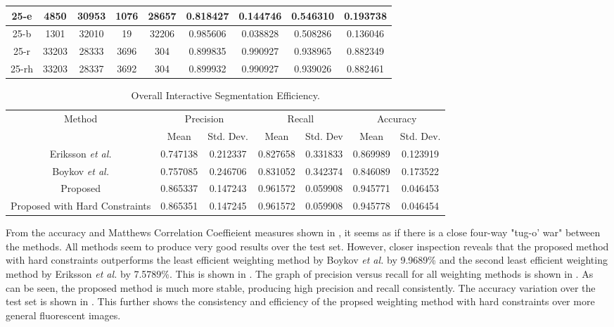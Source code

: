 \begin{longtable}[!h]{|c|c|c|c|c|c|c|c|c|}
	\hline	25-e	&	4850	&	30953	&	1076	&	28657	&	0.818427	&	0.144746	&	0.546310	&	0.193738	\\
	\hline \rowcolor{bad}	25-b	&	1301	&	32010	&	19	&	32206	&	0.985606	&	0.038828	&	0.508286	&	0.136046	\\
	\hline	25-r	&	33203	&	28333	&	3696	&	304	&	0.899835	&	0.990927	&	0.938965	&	0.882349	\\
	\hline \rowcolor{closest}	25-rh	&	33203	&	28337	&	3692	&	304	&	0.899932	&	0.990927	&	0.939026	&	0.882461	\\
	\hline 
\end{longtable} 

\begin{longtable}[!h]{|c|c|c|c|c|c|c|}
	\caption{Overall Interactive Segmentation Efficiency.} \label{tab:overallinteractivesegmentationefficiency}\\
	\hline 
	\multirow{2}{*}{Method} & \multicolumn{2}{c|}{Precision} & \multicolumn{2}{c|}{Recall} & \multicolumn{2}{c|}{Accuracy} \\ 
	\hhline{~------}
	& Mean & Std. Dev. & Mean & Std. Dev & Mean & Std. Dev.  \\ 
	\hline	Eriksson \textit{et al.}	&	0.747138	&	0.212337	&	0.827658	&	0.331833	&	0.869989	&	0.123919	\\
	\hline \rowcolor{bad}	Boykov \textit{et al.}	&	0.757085	&	0.246706	&	0.831052	&	0.342374	&	0.846089	&	0.173522	\\
	\hline	Proposed	&	0.865337	&	0.147243	&	0.961572	&	0.059908	&	0.945771	&	0.046453	\\
	\hline \rowcolor{closest}	Proposed with Hard Constraints	&	0.865351	&	0.147245	&	0.961572	&	0.059908	&	0.945778	&	0.046454	\\	
	\hline
\end{longtable}

From the accuracy and Matthews Correlation Coeffieient measures shown in , it seems as if there is a close four-way "tug-o' war" between the methods. All methods seem to produce very good results over the test set. However, closer inspection reveals that the proposed method with hard constraints outperforms the least efficient weighting method by Boykov \textit{et al.} by 9.9689\% and the second least efficient weighting method by Eriksson \textit{et al.} by 7.5789\%. This is shown in . The graph of precision versus recall for all weighting methods is shown in . As can be seen, the proposed method is much more stable, producing high precision and recall consistently. The accuracy variation over the test set is shown in . This further shows the consistency and efficiency of the propsed weighting method with hard constraints over more general fluorescent images.

